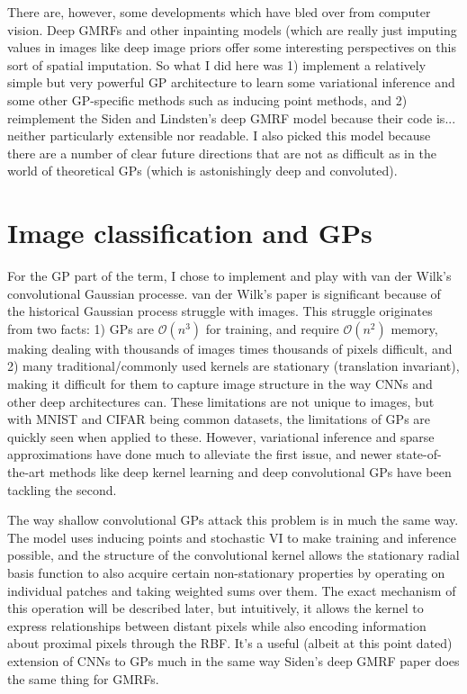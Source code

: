 \documentclass{article}
\begin{document}
There are, however, some developments which have bled over from computer vision.
Deep GMRFs\cite{deepgmrf} and other inpainting models (which are really just
imputing values in images like deep image priors\cite{dip} offer some interesting
perspectives on this sort of spatial imputation.
So what I did here was 1) implement a relatively simple but very powerful GP
architecture to learn some variational inference and some other GP-specific
methods such as inducing point methods, and 2) reimplement the Siden and Lindsten's deep GMRF model
because their code is... neither particularly extensible nor readable. I also picked
this model because there are a number of clear future directions that are not as
difficult as in the world of theoretical GPs (which is astonishingly deep
and convoluted).

\section{Image classification and GPs}
For the GP part of the term, I chose to implement and play with van der Wilk's
convolutional Gaussian processe.
van der Wilk's paper is significant because of the historical Gaussian process
struggle with images. This struggle originates from two facts: 1) GPs are $\mathcal{O}
(n^3)$ for training, and require $\mathcal{O}(n^2)$ memory, making dealing with
thousands of images times thousands of pixels difficult, and 2) many
traditional/commonly used kernels are stationary (translation invariant), making it difficult
for them to capture image structure in the way CNNs and other deep architectures
can. These limitations are not unique to images, but with MNIST and CIFAR being
common datasets, the limitations of GPs are quickly seen when applied to these.
However, variational inference and sparse approximations have done much to alleviate the first issue, and newer
state-of-the-art methods like deep kernel learning \cite{wilson} and deep convolutional
GPs \cite{deepconv} have been tackling the second.

The way shallow convolutional GPs attack this problem is in much the same way. The
model uses inducing points and stochastic VI to make training and inference possible,
and the structure of the convolutional kernel allows the stationary radial basis
function to also acquire certain non-stationary properties by operating on individual
patches and taking weighted sums over them. The exact mechanism of this operation
will be described later, but intuitively, it allows the kernel to express relationships
between distant pixels while also encoding information about proximal pixels
through the RBF. It's a useful (albeit at this point dated) extension of CNNs to GPs
much in the same way Siden's deep GMRF paper does the same thing for GMRFs.
\end{document}
